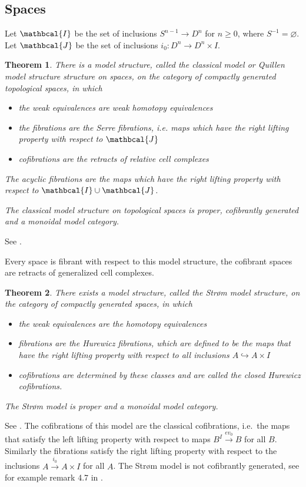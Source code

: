 \documentclass{scrartcl}
\theoremstyle{plain}
\newtheorem{theorem}{Theorem}[section]
\theoremstyle{definition}
\newcommand{\cat}[1]{\mathbcal{#1}}
\renewcommand{\emptyset}{\varnothing}
\newcommand{\union}{\mathbin{\cup}}
\let\xto\xrightarrow
\newcommand{\injto}{\hookrightarrow}
\begin{document}
\subsection{Spaces}\label{subsec:spaces_modelcat}
Let $\cat I$ be the set of inclusions $S^{n-1}\to D^n$ for $n\geq 0$, where $S^{-1}=\emptyset$. Let $\cat J$ be the set of inclusions $i_0\colon D^n\to D^n\times I$.
\begin{theorem}
There is a model structure, called the classical model or Quillen model structure structure on spaces, on the category of compactly generated topological spaces, in which
\begin{itemize}
    \item the weak equivalences are weak homotopy equivalences
    \item the fibrations are the Serre fibrations, i.e. maps which have the right lifting property with respect to $\cat J$
    \item cofibrations are the retracts of relative cell complexes
\end{itemize}
The acyclic fibrations are the maps which have the right lifting property with respect to $\cat I\union\cat J$. 

The classical model structure on topological spaces is proper, cofibrantly generated and a monoidal model category. 
\end{theorem}
See \cite[17.2.2]{may2011more}.

Every space is fibrant with respect to this model structure, the cofibrant spaces are retracts of generalized cell complexes.


\begin{theorem}
    There exists a model structure, called the Strøm model structure, on the category of compactly generated spaces, in which
    \begin{itemize}
        \item the weak equivalences are the homotopy equivalences
        \item fibrations are the Hurewicz fibrations, which are defined to be the maps that have the right lifting property with respect to all inclusions $A\injto A\times I$
        \item cofibrations are determined by these classes and are called the closed Hurewicz cofibrations.
    \end{itemize} 
    The Strøm model is proper and a monoidal model category. 
\end{theorem}
See \cite[17.1.1 and 17.1.3]{may2011more}.
The cofibrations of this model are the classical cofibrations, i.e.\ the maps that satisfy the left lifting property with respect to maps $B^I\xto{ev_0} B$ for all $B$. Similarly the fibrations satisfy the right lifting property with respect to the inclusions $A\xto{i_0} A\times I$ for all $A$. The Strøm model is not cofibrantly generated, see for example remark 4.7 in \cite{raptis2010homotopy}.
\end{document}
